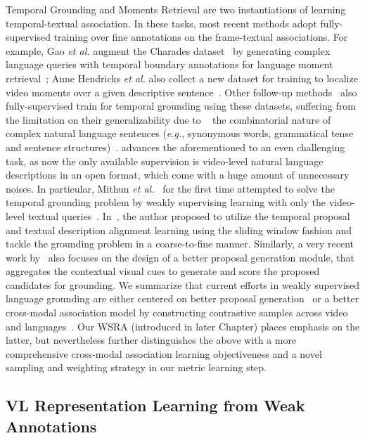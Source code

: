 Temporal Grounding and Moments Retrieval are two instantiations of learning
temporal-textual association.
In these tasks, most recent methods adopt fully-supervised training over 
fine annotations on the frame-textual associations.
For example, Gao \emph{et al.} augment the Charades 
dataset~\citep{sigurdsson2016hollywood} by generating complex language queries with temporal boundary annotations for language moment retrieval~\citep{gao2017tall}; 
Anne Hendricks \emph{et al.} also collect a new dataset for training to localize video moments over a given descriptive sentence~\citep{anne2017localizing}. 
Other follow-up methods~\citep{hendricks2018localizing,liu2018attentive,chen2018temporally,wang2018bidirectional,xu2019joint,gavrilyuk2018actor} also
fully-supervised train for temporal grounding using these datasets,
suffering from the limitation on their generalizability due to  
the combinatorial nature of complex natural language sentences (\textit{e.g.}, 
synonymous words, grammatical tense 
and sentence structures)~\citep{hendricks2018localizing,gao2017tall}. 
advances the aforementioned to an even challenging task, as now the only available supervision is video-level natural language descriptions in an open format, which come with a huge amount of unnecessary noises.
In particular, Mithun \emph{et al.}~\citep{Mithun_2019_CVPR} for the first time attempted to 
solve the temporal grounding problem by weakly supervising learning 
with only the video-level textual queries~\citep{Mithun_2019_CVPR}. 
In~\citep{chen2020look}, the author proposed to utilize the temporal proposal and textual description alignment learning using the sliding window fashion and tackle the grounding problem in a coarse-to-fine manner. Similarly, a very recent work by~\citep{lin2019weakly} also focuses on the design of a better proposal generation module, that aggregates the contextual visual cues to generate and score the proposed candidates for grounding. We summarize that current efforts in weakly supervised language grounding are either centered on better proposal generation~\citep{chen2020look,lin2019weakly} or a better cross-modal association model by constructing contrastive samples across video and languages~\citep{Mithun_2019_CVPR,gao2019wslln}. Our WSRA (introduced in later Chapter) places emphasis on the latter, but nevertheless further distinguishes the above with a more comprehensive cross-modal association learning objectiveness and a novel sampling and weighting strategy in our metric learning step.

\subsection{VL Representation Learning from Weak Annotations}

